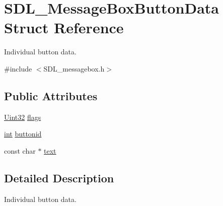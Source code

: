 \hypertarget{struct_s_d_l___message_box_button_data}{\section{S\-D\-L\-\_\-\-Message\-Box\-Button\-Data Struct Reference}
\label{struct_s_d_l___message_box_button_data}
}


Individual button data.  




{\ttfamily \#include $<$S\-D\-L\-\_\-messagebox.\-h$>$}

\subsection*{Public Attributes}
\begin{DoxyCompactItemize}
\item 
\hyperlink{_s_d_l__stdinc_8h_add440eff171ea5f55cb00c4a9ab8672d}{Uint32} \hyperlink{struct_s_d_l___message_box_button_data_a426c8b5da0e718242c7840706d95de0b}{flags}
\item 
\hyperlink{_s_d_l__thread_8h_a6a64f9be4433e4de6e2f2f548cf3c08e}{int} \hyperlink{struct_s_d_l___message_box_button_data_a22938886a6b13792006cc5c91fa38e92}{buttonid}
\item 
const char $\ast$ \hyperlink{struct_s_d_l___message_box_button_data_af35f3062f0577159284c8828caaf08e4}{text}
\end{DoxyCompactItemize}


\subsection{Detailed Description}
Individual button data. 

